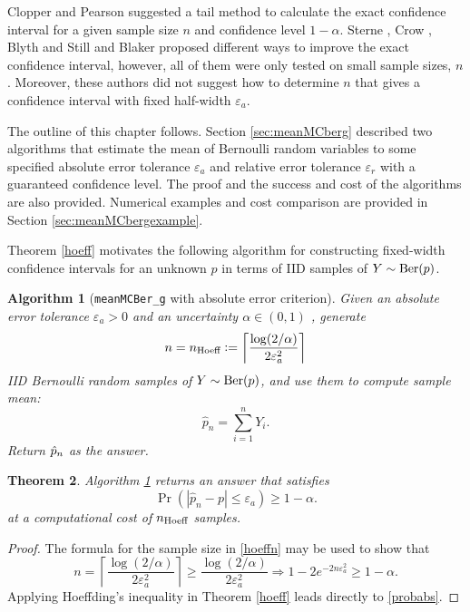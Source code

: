 \documentclass{iitthesis}
\newtheorem{theorem}{Theorem}[section]
\newtheorem{algorithm}[theorem]{Algorithm}
\theoremstyle{definition}
\begin{document}
Clopper and Pearson \cite{CP34} suggested a tail method to calculate the exact confidence interval for a given sample size $n$ and confidence level $1-\alpha$. Sterne \cite{sterne54}, Crow \cite{crow56}, Blyth and Still \cite{BS83} and Blaker \cite{Blaker00} proposed different ways to improve the exact confidence interval, however, all of them were only tested on small sample sizes, $n$.  Moreover, these authors did not suggest how to determine $n$ that gives a confidence interval with fixed half-width $\varepsilon_a$. 

The outline of this chapter follows. Section \ref{sec:meanMCberg} described two algorithms that estimate the mean of Bernoulli random variables to some specified absolute error tolerance $\varepsilon_a$ and relative error tolerance $\varepsilon_r$ with a guaranteed confidence level. The proof and the success and cost of the algorithms are also provided. Numerical examples and cost comparison are provided in Section \ref{sec:meanMCbergexample}. 

 \label{sec:meanMCberg}

Theorem \ref{hoeff} motivates the following algorithm for constructing fixed-width confidence intervals for an unknown $p$ in terms of IID samples of $Y\sim \operatorname{Ber}(p)$.
\begin{algorithm}[{\tt meanMCBer\_g} with absolute error criterion]\label{algabs}
Given an absolute error tolerance $\varepsilon_a > 0$ and an uncertainty $\alpha \in (0,1)$ , generate
\begin{equation}\label{hoeffn}
n = n_{\text{Hoeff}} := \left \lceil  \frac{\log(2/\alpha)}{2\varepsilon_a^2} \right \rceil
\end{equation}
IID Bernoulli random samples of $Y \sim \operatorname{Ber}(p)$, and use them to compute sample mean:
\begin{equation} \label{abserrp}
\hat{p}_n = \sum_{i =1}^n Y_i.
\end{equation}
Return $\hat{p}_n$ as the answer.
\end{algorithm}
\begin{theorem}
Algorithm \ref{algabs} returns an answer that satisfies 
\begin{equation}\label{probabs}
\Pr\left(|\hat{p}_n -p| \leq \varepsilon_a\right) \geq 1-\alpha.
\end{equation}
at a computational cost of $n_{\text{Hoeff}}$ samples.
\end{theorem}
\begin{proof}
The formula for the sample size in \eqref{hoeffn} may be used to show that
\begin{equation*}
n = \left \lceil \frac{\log(2/\alpha)}{2\varepsilon_a^2} \right \rceil \geq  \frac{\log(2/\alpha)}{2\varepsilon_a^2} \Rightarrow 
1- 2e^{-2n\varepsilon_a^2} \geq 1-\alpha.
\end{equation*}
Applying Hoeffding's inequality in Theorem \ref{hoeff} leads directly to \eqref{probabs}. 
\end{proof}
\end{document}
